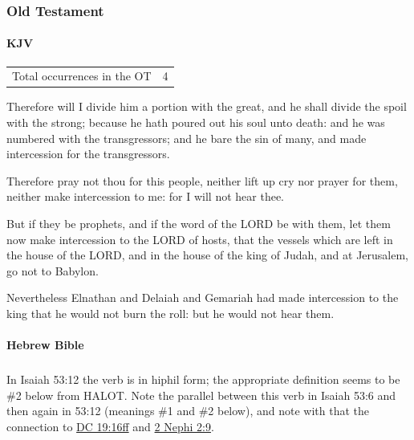 	\subsubsection{Old Testament} %
		\label{INTERCESSION-OT}
	
		\paragraph{KJV}
			\label{INTERCESSION-OT-KJV}
	
			\begin{tabular}{ll}
				Total occurrences in the OT & 4
			\end{tabular}
			
			\begin{compactdesc}
				\item[Isaiah 53:12] Therefore will I divide him a portion with the great, and he shall divide the spoil with the strong; because he hath poured out his soul unto death: and he was numbered with the transgressors; and he bare the sin of many, and made intercession for the transgressors.
				\item[Jeremiah 7:16] Therefore pray not thou for this people, neither lift up cry nor prayer for them, neither make intercession to me: for I will not hear thee.
				\item[Jeremiah 27:18] But if they be prophets, and if the word of the LORD be with them, let them now make intercession to the LORD of hosts, that the vessels which are left in the house of the LORD, and in the house of the king of Judah, and at Jerusalem, go not to Babylon.
				\item[Jeremiah 36:25] Nevertheless Elnathan and Delaiah and Gemariah had made intercession to the king that he would not burn the roll: but he would not hear them.
			\end{compactdesc}
			
		\paragraph{Hebrew Bible}
			\label{INTERCESSION-HEBREW}
		
			\subparagraph{\texorpdfstring{}{}}
				\label{PAGA} %
				
				In Isaiah 53:12 the verb is in hiphil form; the appropriate definition seems to be \#2 below from HALOT. Note the parallel between this verb in Isaiah 53:6 and then again in 53:12 (meanings \#1 and \#2 below), and note with that the connection to \hyperref[DC19-16]{DC 19:16ff} and \hyperref[2NEPHI-2-9]{2 Nephi 2:9}.
			
